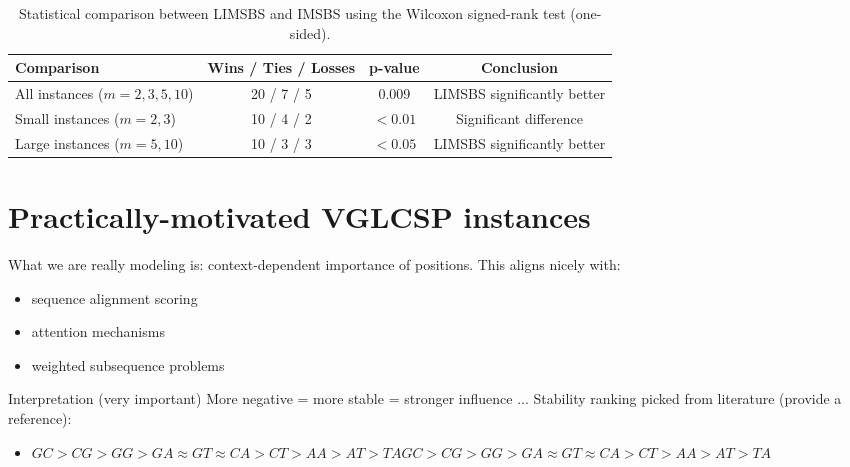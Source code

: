 \documentclass[11pt,a4paper]{article}
\begin{document}
\begin{table}[t]
	\centering
	\caption{Statistical comparison between LIMSBS and IMSBS using the Wilcoxon signed-rank test (one-sided).}
	\label{tab:statistical_test}
	\vspace{0.2cm}
	\begin{tabular}{lccc}
		\hline
		\textbf{Comparison} & \textbf{Wins / Ties / Losses} & \textbf{p-value} & \textbf{Conclusion} \\
		\hline
		All instances ($m = 2,3,5,10$) & 20 / 7 / 5 & 0.009 & LIMSBS significantly better \\
		Small instances ($m = 2,3$)    & 10 / 4 / 2  & $<0.01$ & Significant difference \\
		Large instances ($m = 5,10$)   & 10 / 3 / 3 & $< 0.05$ & LIMSBS significantly better \\
		\hline
	\end{tabular}
\end{table}
  


 

   
  \section{Practically-motivated VGLCSP instances }
  
  What we are really modeling is: context-dependent importance of positions.  This aligns nicely with:
  \begin{itemize}
  	\item  sequence alignment scoring
    \item attention mechanisms
    \item  weighted subsequence problems
  \end{itemize}
  
  Interpretation (very important)
  More negative = more stable = stronger influence ...
  Stability ranking picked from literature (provide a reference):
  \begin{itemize}
  	\item   $GC>CG>GG>GA \approx GT \approx CA>CT>AA>AT>TA
  GC>CG>GG>GA \approx GT \approx CA>CT>AA>AT>TA$
   \end{itemize}
  
\end{document}
